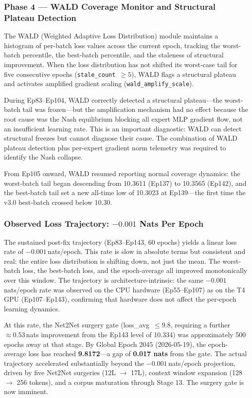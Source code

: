\documentclass[11pt,a4paper]{article}
\begin{document}
\subsubsection{Phase 4 --- WALD Coverage Monitor and Structural Plateau Detection}
\label{subsubsec:phase4}

The WALD (Weighted Adaptive Loss Distribution) module maintains a histogram of
per-batch loss values across the current epoch, tracking the worst-batch percentile,
the best-batch percentile, and the staleness of structural improvement. When the
loss distribution has not shifted its worst-case tail for five consecutive epochs
(\texttt{stale\_count}~$\geq 5$), WALD flags a structural plateau and activates
amplified gradient scaling (\texttt{wald\_amplify\_scale}).

During Ep83--Ep104, WALD correctly detected a structural plateau---the worst-batch
tail was frozen---but the amplification mechanism had no effect because the root
cause was the Nash equilibrium blocking all expert MLP gradient flow, not an
insufficient learning rate. This is an important diagnostic: WALD can detect
structural freezes but cannot diagnose their cause. The combination of WALD plateau
detection plus per-expert gradient norm telemetry was required to identify the
Nash collapse.

From Ep105 onward, WALD resumed reporting normal coverage dynamics: the
worst-batch tail began descending from 10.3611 (Ep137) to 10.3565 (Ep142),
and the best-batch tail set a new all-time low of 10.3023 at Ep139---the first
time the v3.0 best-batch crossed below 10.30.

\subsubsection{Observed Loss Trajectory: $-0.001$ Nats Per Epoch}

The sustained post-fix trajectory (Ep83--Ep143, 60 epochs) yields a linear
loss rate of $-0.001$\,nats/epoch. This rate is slow in absolute terms but
consistent and real: the entire loss distribution is shifting down, not just
the mean. The worst-batch loss, the best-batch loss, and the epoch-average all
improved monotonically over this window. The trajectory is architecture-intrinsic:
the same $-0.001$\,nats/epoch rate was observed on the CPU hardware (Ep55--Ep107)
as on the T4 GPU (Ep107--Ep143), confirming that hardware does not affect the
per-epoch learning dynamics.

At this rate, the Net2Net surgery gate (loss\_avg~$\leq 9.8$, requiring a further
$\approx 0.53$\,nats improvement from the Ep143 level of 10.334) was approximately
500 epochs away at that stage. By Global Epoch 2045 (2026-05-19), the epoch-average
loss has reached \textbf{9.8172}---a gap of \textbf{0.017 nats} from the gate.
The actual trajectory accelerated substantially beyond the $-0.001$\,nats/epoch
projection, driven by five Net2Net surgeries (12L $\to$ 17L), context window
expansion (128 $\to$ 256 tokens), and a corpus maturation through Stage 13.
The surgery gate is now imminent.
\end{document}
